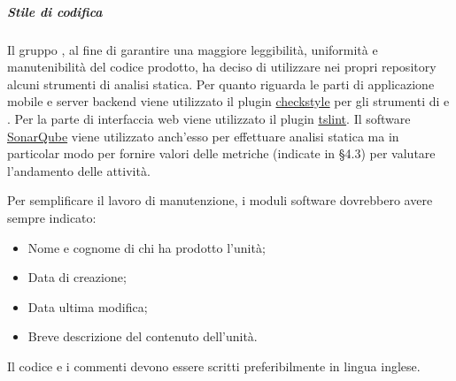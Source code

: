 \subparagraph*{Stile di codifica}
Il gruppo \Gruppo{}, al fine di garantire una maggiore leggibilità, uniformità e manutenibilità del codice prodotto, ha deciso di utilizzare nei propri repository alcuni strumenti di analisi statica.
Per quanto riguarda le parti di applicazione mobile e server backend viene utilizzato il plugin \href{https://checkstyle.sourceforge.io}{checkstyle} per gli strumenti di   e .
Per la parte di interfaccia web viene utilizzato il plugin \textbf{} \href{https://palantir.github.io/tslint/}{tslint}.
Il software \href{https://www.sonarqube.org/}{SonarQube} viene utilizzato anch'esso per effettuare analisi statica ma in particolar modo per fornire valori delle metriche (indicate in §4.3) per valutare l'andamento delle attività.

Per semplificare il lavoro di manutenzione, i moduli software dovrebbero avere sempre indicato: 
\begin{itemize}
	\item Nome e cognome di chi ha prodotto l'unità;
	\item Data di creazione;
	\item Data ultima modifica;
	\item Breve descrizione del contenuto dell'unità.
\end{itemize} 

Il codice e i commenti devono essere scritti preferibilmente in lingua inglese.